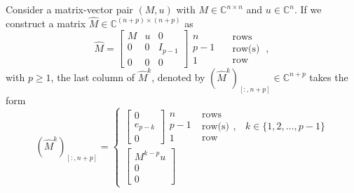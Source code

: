 \begin{mdframed}
    \begin{lemma}
        \label{lem:embeddedmatrixpowered}
        Consider a matrix-vector pair $(M, u)$ with $M \in \mathbb{C}^{n \times n}$
        and $u \in \mathbb{C}^n$.
        If we construct a matrix $\hat{M} \in \mathbb{C}^{(n+p) \times (n+p)}$ as
        \begin{equation}
            \label{eq:embeddedmatrixdefinition}
            \hat{M} =
            \begin{bmatrix}
                M & u & 0       \\
                0   & 0   & I_{p-1} \\
                0   & 0   & 0
            \end{bmatrix}
            \begin{matrix} n \\ p-1 \\ 1 \end{matrix}
            \begin{matrix} \quad \text{rows} \\ \quad \text{row(s)} \\ \quad \text{row} \end{matrix}
            \: ,
        \end{equation}
        with $p \ge 1$, the last column of $\hat{M}^k$, denoted by $(\hat{M}^k)_{[:, n+p]}
        \in \mathbb{C}^{n+p}$ takes the form
        \begin{equation*}
            \label{eq:embeddedmatrixpowered}
            (\hat{M}^k)_{[:, n+p]} =
            \begin{cases}
                \begin{bmatrix} 0 \\ e_{p-k} \\ 0 \end{bmatrix}
                \begin{matrix} n \\ p-1 \\ 1 \end{matrix}
                \; \begin{matrix} \text{rows} \\ \text{row(s)} \\ \text{row} \end{matrix},
                & k \in \{ 1, 2, \dots, p-1 \}
                \\
                \begin{bmatrix} M^{k-p} u \\ 0 \\ 0 \end{bmatrix}

\end{cases}
\end{equation*}
\end{lemma}
\end{mdframed}
